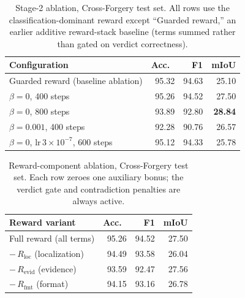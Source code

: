 \documentclass[10pt,twocolumn,letterpaper]{article}
\begin{document}
\begin{table}[h]
\centering
\small
\caption{Stage-2 ablation, Cross-Forgery test set. All rows use the classification-dominant reward except ``Guarded reward,'' an earlier additive reward-stack baseline (terms summed rather than gated on verdict correctness).}
\label{tab:ablation-rl}
\begin{tabular}{lrrr}
\toprule
Configuration & Acc.\ & F1 & mIoU \\
\midrule
Guarded reward (baseline ablation) & 95.32 & 94.63 & 25.10 \\
$\beta{=}0$, 400 steps & 95.26 & 94.52 & 27.50 \\
$\beta{=}0$, 800 steps & 93.89 & 92.80 & \textbf{28.84} \\
$\beta{=}0.001$, 400 steps & 92.28 & 90.76 & 26.57 \\
$\beta{=}0$, lr\,$3{\times}10^{-7}$, 600 steps & 95.12 & 94.33 & 25.78 \\
\bottomrule
\end{tabular}
\end{table}

\begin{table}[h]
\centering
\small
\caption{Reward-component ablation, Cross-Forgery test set. Each row zeroes one auxiliary bonus; the verdict gate and contradiction penalties are always active.}
\label{tab:ablation-reward}
\begin{tabular}{lrrr}
\toprule
Reward variant & Acc.\ & F1 & mIoU \\
\midrule
Full reward (all terms) & 95.26 & 94.52 & 27.50 \\
\quad $-\,R_{\mathrm{loc}}$ (localization) & 94.49 & 93.58 & 26.04 \\
\quad $-\,R_{\mathrm{evid}}$ (evidence) & 93.59 & 92.47 & 27.56 \\
\quad $-\,R_{\mathrm{fmt}}$ (format) & 94.15 & 93.16 & 26.78 \\
\bottomrule
\end{tabular}
\end{table}
\end{document}
